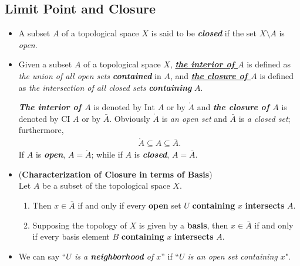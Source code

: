 \documentclass[11pt]{article}
\begin{document}
\subsection{Limit Point and Closure}
\begin{itemize}
\item \begin{definition}
A subset $A$ of a topological space $X$ is said to be \emph{\textbf{closed}} if the set $X \setminus A$ is \emph{open}.
\end{definition}

\item \begin{definition}
Given a subset $A$ of a topological space $X$, \underline{\emph{\textbf{the interior of $A$}}} is defined as \emph{the union of all open sets} \emph{\textbf{contained}} in $A$, and \underline{\emph{\textbf{the closure of $A$}}} is defined as \emph{the intersection of all closed sets} \emph{\textbf{containing}} $A$.

\emph{\textbf{The interior of $A$}} is denoted by $\text{Int }A$ or by $\mathring{A}$ and \emph{\textbf{the closure of $A$}} is denoted by $\text{CI }A$ or
by $\bar{A}$. Obviously $\mathring{A}$ is \emph{an open set} and $\bar{A}$ is \emph{a closed set}; furthermore,
\begin{align*}
\mathring{A} \subseteq A \subseteq \bar{A}.
\end{align*}
If $A$ is \emph{\textbf{open}}, $A = \mathring{A}$; while if $A$ is \emph{\textbf{closed}}, $A = \bar{A}$.
\end{definition}

\item \begin{proposition} (\textbf{Characterization of Closure in terms of Basis}) \citep{munkres2000topology} \\
Let $A$ be a subset of the topological space $X$.
\begin{enumerate}
\item Then $x \in \bar{A}$ if and only if every \textbf{open} set $U$ \textbf{containing} $x$ \textbf{intersects} $A$.
\item Supposing the topology of $X$ is given by a \textbf{basis}, then $x \in \bar{A}$ if and only if every basis element $B$ \textbf{containing} $x$ \textbf{intersects} $A$.
\end{enumerate}
\end{proposition}

\item \begin{remark}
We can say ``\emph{$U$ is a \textbf{neighborhood} of $x$}'' if ``\emph{$U$ is an open set containing $x$}".
\end{remark}


\end{itemize}
\end{document}
